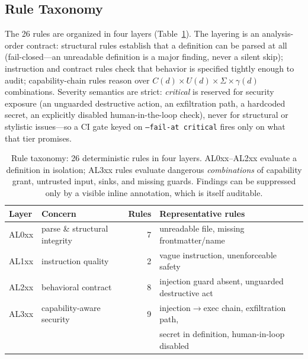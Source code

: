\documentclass[11pt]{article}
\begin{document}
\subsection{Rule Taxonomy}
The 26 rules are organized in four layers (Table~\ref{tab:taxonomy}). The layering is an
analysis-order contract: structural rules establish that a definition can be parsed at all
(fail-closed---an unreadable definition is a major finding, never a silent skip); instruction and
contract rules check that behavior is specified tightly enough to audit; capability-chain rules
reason over $C(d) \times U(d) \times \Sigma \times \gamma(d)$ combinations. Severity semantics are
strict: \emph{critical} is reserved for security exposure (an unguarded destructive action, an
exfiltration path, a hardcoded secret, an explicitly disabled human-in-the-loop check), never for
structural or stylistic issues---so a CI gate keyed on \texttt{--fail-at critical} fires only on
what that tier promises.

\begin{table}[h]
\centering
\begin{tabular}{llrl}
\toprule
Layer & Concern & Rules & Representative rules \\
\midrule
AL0xx & parse \& structural integrity & 7 & unreadable file, missing frontmatter/name \\
AL1xx & instruction quality           & 2 & vague instruction, unenforceable safety \\
AL2xx & behavioral contract           & 8 & injection guard absent, unguarded destructive act \\
AL3xx & capability-aware security     & 9 & injection$\to$exec chain, exfiltration path, \\
      &                               &   & secret in definition, human-in-loop disabled \\
\bottomrule
\end{tabular}
\caption{Rule taxonomy: 26 deterministic rules in four layers. AL0xx--AL2xx evaluate a definition
in isolation; AL3xx rules evaluate dangerous \emph{combinations} of capability grant, untrusted
input, sinks, and missing guards. Findings can be suppressed only by a visible inline annotation,
which is itself auditable.}
\label{tab:taxonomy}
\end{table}
\end{document}
